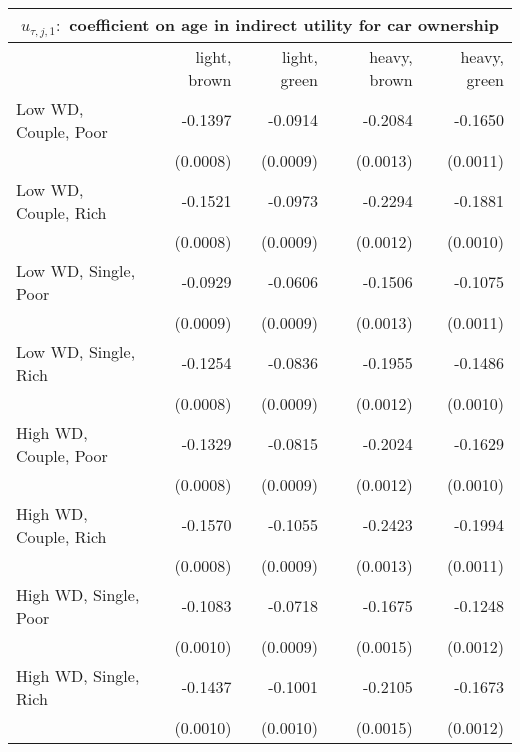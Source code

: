 \begin{tabular}{lrrrr} 
\toprule 
\multicolumn{5}{c}{$u_{\tau,j,1} : $ coefficient on age in indirect utility for car ownership} \\ 
\midrule
                                & light, brown   & light, green   & heavy, brown   & heavy, green  \\ 
\midrule 
          Low WD, Couple, Poor  &      -0.1397   &      -0.0914   &      -0.2084   &      -0.1650  \\ 
                                & (0.0008)   & (0.0009)   & (0.0013)   & (0.0011)  \\ 
          Low WD, Couple, Rich  &      -0.1521   &      -0.0973   &      -0.2294   &      -0.1881  \\ 
                                & (0.0008)   & (0.0009)   & (0.0012)   & (0.0010)  \\ 
          Low WD, Single, Poor  &      -0.0929   &      -0.0606   &      -0.1506   &      -0.1075  \\ 
                                & (0.0009)   & (0.0009)   & (0.0013)   & (0.0011)  \\ 
          Low WD, Single, Rich  &      -0.1254   &      -0.0836   &      -0.1955   &      -0.1486  \\ 
                                & (0.0008)   & (0.0009)   & (0.0012)   & (0.0010)  \\ 
         High WD, Couple, Poor  &      -0.1329   &      -0.0815   &      -0.2024   &      -0.1629  \\ 
                                & (0.0008)   & (0.0009)   & (0.0012)   & (0.0010)  \\ 
         High WD, Couple, Rich  &      -0.1570   &      -0.1055   &      -0.2423   &      -0.1994  \\ 
                                & (0.0008)   & (0.0009)   & (0.0013)   & (0.0011)  \\ 
         High WD, Single, Poor  &      -0.1083   &      -0.0718   &      -0.1675   &      -0.1248  \\ 
                                & (0.0010)   & (0.0009)   & (0.0015)   & (0.0012)  \\ 
         High WD, Single, Rich  &      -0.1437   &      -0.1001   &      -0.2105   &      -0.1673  \\ 
                                & (0.0010)   & (0.0010)   & (0.0015)   & (0.0012)  \\ 
\bottomrule \end{tabular} 
